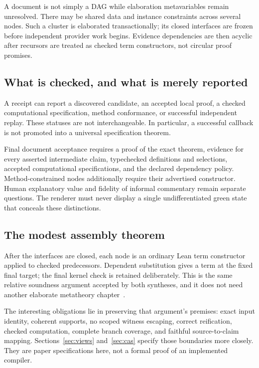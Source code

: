 \documentclass[11pt,a4paper]{article}
\theoremstyle{definition}
\begin{document}
A document is not simply a DAG while elaboration metavariables remain unresolved.
There may be shared data and instance constraints across several nodes. Such a
cluster is elaborated transactionally; its closed interfaces are frozen before
independent provider work begins. Evidence dependencies are then acyclic after
recursors are treated as checked term constructors, not circular proof promises.

\subsection{What is checked, and what is merely reported}
A receipt can report a discovered candidate, an accepted local proof, a checked
computational specification, method conformance, or successful independent
replay. These statuses are not interchangeable. In particular, a successful
callback is not promoted into a universal specification theorem.

Final document acceptance requires a proof of the exact theorem, evidence for
every asserted intermediate claim, typechecked definitions and selections,
accepted computational specifications, and the declared dependency policy.
Method-constrained nodes additionally require their advertised constructor.
Human explanatory value and fidelity of informal commentary remain separate
questions. The renderer must never display a single undifferentiated green state
that conceals these distinctions.

\subsection{The modest assembly theorem}
After the interfaces are closed, each node is an ordinary Lean term constructor
applied to checked predecessors. Dependent substitution gives a term at the
fixed final target; the final kernel check is retained deliberately. This is the
same relative soundness argument accepted by both syntheses, and it does not
need another elaborate metatheory chapter~\cite{synthesis,blueprints}.

The interesting obligations lie in preserving that argument's premises: exact
input identity, coherent supports, no scoped witness escaping, correct
reification, checked computation, complete branch coverage, and faithful
source-to-claim mapping. Sections~\ref{sec:views} and~\ref{sec:cas} specify those
boundaries more closely. They are paper specifications here, not a formal proof
of an implemented compiler.
\end{document}
